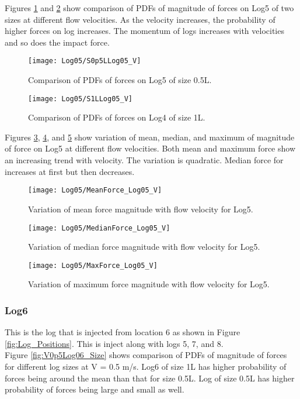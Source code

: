 \noindent Figures \ref{fig:S0p5LLog05_V} and \ref{fig:S1LLog05_V} show comparison of PDFs of magnitude of forces on Log5 of two sizes at different flow velocities. As the velocity increases, the probability of higher forces on log increases. The momentum of logs increases with velocities and so does the impact force.

\begin{figure}
\centering
\texttt{[image: Log05/S0p5LLog05\_V]}
\caption{\label{fig:S0p5LLog05_V}Comparison of PDFs of forces on Log5 of size 0.5L.}
\end{figure}
\begin{figure}
\centering
\texttt{[image: Log05/S1LLog05\_V]}
\caption{\label{fig:S1LLog05_V}Comparison of PDFs of forces on Log4 of size 1L.}
\end{figure}

\noindent Figures \ref{fig:MeanForce_Log05_V}, \ref{fig:MedianForce_Log05_V}, and \ref{fig:MaxForce_Log05_V} show variation of mean, median, and maximum of magnitude of force on Log5 at different flow velocities. Both mean and maximum force show an increasing trend with velocity. The variation is quadratic. Median force for increases at first but then decreases. 

\begin{figure}
\centering
\texttt{[image: Log05/MeanForce\_Log05\_V]}
\caption{\label{fig:MeanForce_Log05_V}Variation of mean force magnitude with flow velocity for Log5.}
\end{figure}
\begin{figure}
\centering
\texttt{[image: Log05/MedianForce\_Log05\_V]}
\caption{\label{fig:MedianForce_Log05_V}Variation of median force magnitude with flow velocity for Log5.}
\end{figure}
\begin{figure}
\centering
\texttt{[image: Log05/MaxForce\_Log05\_V]}
\caption{\label{fig:MaxForce_Log05_V}Variation of maximum force magnitude with flow velocity for Log5.}
\end{figure}

\FloatBarrier
\subsubsection{Log6}
This is the log that is injected from location 6 as shown in Figure \ref{fig:Log_Positions}. This is inject along with logs 5, 7, and 8.\\ 
Figure \ref{fig:V0p5Log06_Size} shows comparison of PDFs of magnitude of forces for different log sizes at V = 0.5 m/s. Log6 of size 1L has higher probability of forces being around the mean than that for size 0.5L. Log of size 0.5L has higher probability of forces being large and small as well.

